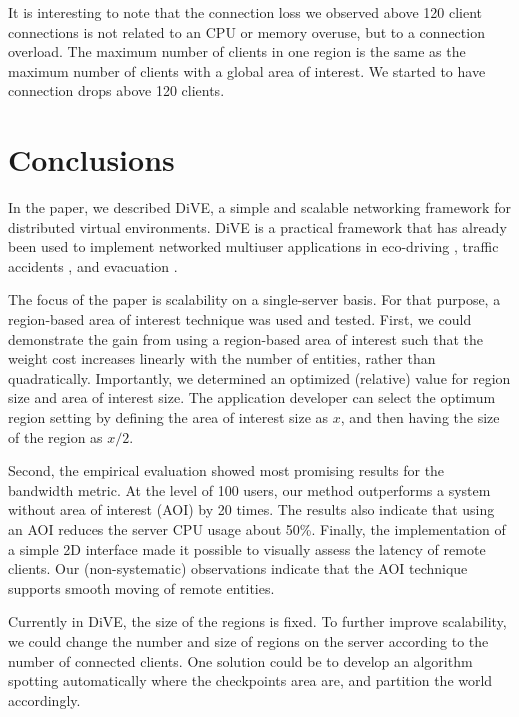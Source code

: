 \documentclass[]{elsarticle}
\begin{document}
It is interesting to note that the connection loss we observed above 120 client connections is not related to an CPU or memory overuse, but to a connection overload.
The maximum number of clients in one region is the same as the maximum number of clients with a global area of interest. We started to have connection drops above 120 clients.

\section{Conclusions}\label{sec:Conclusions}

In the paper, we described DiVE, a simple and scalable networking framework for distributed virtual environments. DiVE is a practical framework that has already been used to implement networked multiuser applications in eco-driving \cite{Madruga+others.2012,Madruga+Prendinger.2013}, traffic accidents \cite{Gajananan+others.2013}, and evacuation \cite{Berg+others.2012}.

The focus of the paper is scalability on a single-server basis. For that purpose, a region-based area of interest technique was used and tested. First, we could demonstrate the gain from using a region-based area of interest such that the weight cost increases linearly with the number of entities, rather than quadratically. Importantly, we determined an optimized (relative) value for region size and area of interest size. The application developer can select the optimum region setting by defining the area of interest size as $x$, and then having the size of the region as $x/2$.

Second, the empirical evaluation showed most promising results for the bandwidth metric. At the level of 100 users, our method outperforms a system without area of interest (AOI) by 20 times. The results also indicate that using an AOI reduces the server CPU usage about 50\%. Finally, the implementation of a simple 2D interface made it possible to visually assess the latency of remote clients. Our (non-systematic) observations indicate that the AOI technique supports smooth moving of remote entities.

Currently in DiVE, the size of the regions is fixed. To further improve scalability, we could change the number and size of regions on the server according to the number of connected clients. One solution could be to develop an algorithm spotting automatically where the checkpoints area are, and partition the world accordingly.
\end{document}
